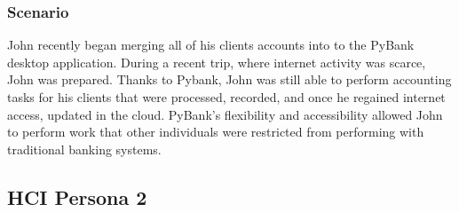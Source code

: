 \begin{Parallel}[v]{0.48\textwidth}{0.48\textwidth}
{\begin{minipage}{0.40\textwidth}
    \subsubsection*{Scenario}
    \begin{centering}
        John recently began merging all of his clients accounts into to the PyBank desktop application. During a recent trip, where internet activity was scarce, John was prepared. Thanks to Pybank, John was still able to perform accounting tasks for his clients that were processed, recorded, and once he regained internet access, updated in the cloud. PyBank's flexibility and accessibility allowed John to perform work that other individuals were restricted from performing with traditional banking systems.
        \vspace{10mm}
    \end{centering}
\end{minipage}}
\ParallelPar
\end{Parallel}

\newpage

\subsection{HCI Persona 2}
\label{sect:hci_persona_2}

